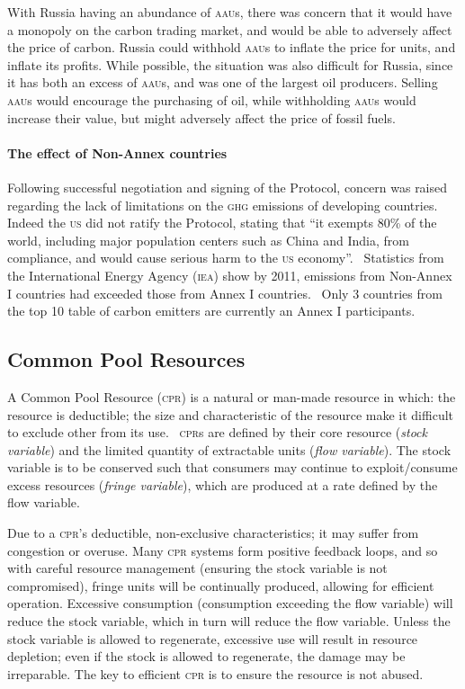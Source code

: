 With Russia having an abundance of \textsc{aau}s, there was concern that it would have a monopoly on the carbon trading market, and would be able to adversely affect the price of carbon. Russia could withhold \textsc{aau}s to inflate the price for units, and inflate its profits. While possible, the situation was also difficult for Russia, since it has both an excess of \textsc{aau}s, and was one of the largest oil producers. Selling \textsc{aau}s would encourage the purchasing of oil, while withholding \textsc{aau}s would increase their value, but might adversely affect the price of fossil fuels.

\paragraph{The effect of Non-Annex countries}

Following successful negotiation and signing of the Protocol, concern was raised regarding the lack of limitations on the \textsc{ghg} emissions of developing countries. Indeed the \textsc{us} did not ratify the Protocol, stating that ``it exempts 80\% of the world, including major population centers such as China and India, from compliance, and would cause serious harm to the \textsc{us} economy''.~\cite{Hague-to-Marrakesh} Statistics from the International Energy Agency (\textsc{iea}) show by 2011, emissions from Non-Annex I countries had exceeded those from Annex I countries.~\cite{IEA-highlights} Only 3 countries from the top 10 table of carbon emitters are currently an Annex I participants.

\subsection{Common Pool Resources}

A Common Pool Resource (\textsc{cpr}) is a natural or man-made resource in which: the resource is deductible; the size and characteristic of the resource make it difficult to exclude other from its use.~\cite{Ostrom-90} \textsc{cpr}s are defined by their core resource (\emph{stock variable}) and the limited quantity of extractable units (\emph{flow variable}). The stock variable is to be conserved such that consumers may continue to exploit/consume excess resources (\emph{fringe variable}), which are produced at a rate defined by the flow variable.

Due to a \textsc{cpr}'s deductible, non-exclusive characteristics; it may suffer from congestion or overuse. Many \textsc{cpr} systems form positive feedback loops, and so with careful resource management (ensuring the stock variable is not compromised), fringe units will be continually produced, allowing for efficient operation. Excessive consumption (consumption exceeding the flow variable) will reduce the stock variable, which in turn will reduce the flow variable. Unless the stock variable is allowed to regenerate, excessive use will result in resource depletion; even if the stock is allowed to regenerate, the damage may be irreparable. The key to efficient \textsc{cpr} is to ensure the resource is not abused.

